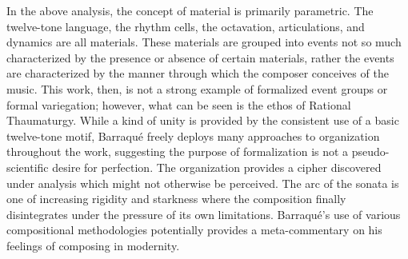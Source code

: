In the above analysis, the concept of material is primarily parametric. The twelve-tone language, the rhythm cells, the octavation, articulations, and dynamics are all materials. These materials are grouped into events not so much characterized by the presence or absence of certain materials, rather the events are characterized by the manner through which the composer conceives of the music. This work, then, is not a strong example of formalized event groups or formal variegation; however, what can be seen is the ethos of Rational Thaumaturgy. While a kind of unity is provided by the consistent use of a basic twelve-tone motif, Barraqué freely deploys many approaches to organization throughout the work, suggesting the purpose of formalization is not a pseudo-scientific desire for perfection. The organization provides a cipher discovered under analysis which might not otherwise be perceived. The arc of the sonata is one of increasing rigidity and starkness where the composition finally disintegrates under the pressure of its own limitations. Barraqué's use of various compositional methodologies potentially provides a meta-commentary on his feelings of composing in modernity.